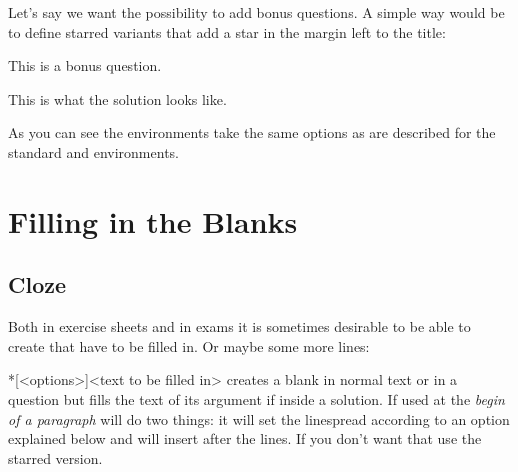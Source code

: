 \documentclass[DIV10,toc=index,toc=bib,numbers=noendperiod]{cnpkgdoc}
\begin{document}
Let's say we want the possibility to add bonus questions.  A simple way would
be to define starred variants that add a star in the margin left to the title:
\begin{beispiel}
 \begin{question*}
  This is a bonus question.
 \end{question*}
 \begin{solution*}[print]
  This is what the solution looks like.
 \end{solution*}
\end{beispiel}
As you can see the environments take the same options as are described for the
standard  and  environments.

\section{Filling in the Blanks}
\subsection{Cloze}
\noindent{}Both in exercise sheets and in exams it is
sometimes desirable to be able to create  that have to be filled
in.  Or maybe some more lines: \blank[width=5\linewidth]{}

\begin{beschreibung}
  *[<options>]{<text to be filled in>}\newline
    creates a blank in normal text or in a question but fills the text of its
    argument if inside a solution.  If used at the \emph{begin of a paragraph}
     will do two things: it will set the linespread according to an
    option explained below and will insert  after the lines.  If you
    don't want that use the starred version.
\end{beschreibung}
\end{document}
